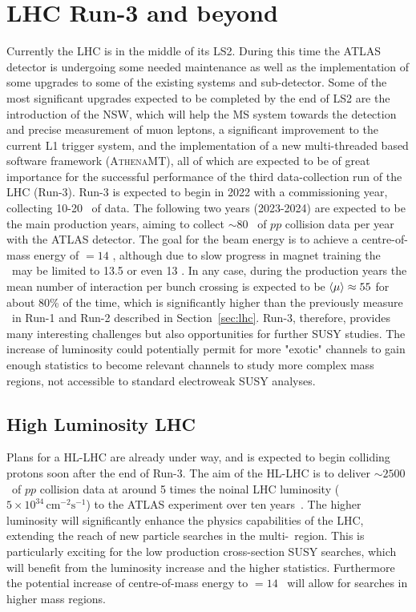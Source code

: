 	\section{\ac{LHC} Run-3 and beyond}
	\label{sec:lhc&beyond}	
	Currently the \ac{LHC} is in the middle of its \ac{LS2}. During this time the \ac{ATLAS} detector is undergoing some needed maintenance as well as the implementation of some upgrades to some of the existing systems and sub-detector. 
	Some of the most significant upgrades expected to be completed by the end of \ac{LS2} are the introduction of the \ac{NSW}, which will help the \ac{MS} system towards the detection and precise measurement of muon leptons, a significant improvement to the current \ac{L1} trigger system, and the implementation of a new multi-threaded based software framework (\textsc{AthenaMT}), all of which are expected to be of great importance for the successful performance of the third data-collection run of the \ac{LHC} (Run-3).
	Run-3 is expected to begin in 2022 with a commissioning year, collecting 10-20 \infb\ of data. 
	The following two years (2023-2024) are expected to be the main production years, aiming to collect $\sim80$ \infb\ of $pp$ collision data per year with the \ac{ATLAS} detector. 
	The goal for the beam energy is to achieve a centre-of-mass energy of \com$=14$ \tev , although due to slow progress in magnet training the \com\ may be limited to 13.5 or even 13 \tev .
	In any case, during the production years the mean number of interaction per bunch crossing is expected to be $\langle\mu\rangle\approx55$ for about 80\% of the time, which is significantly higher than the previously measure \mubar\ in Run-1 and Run-2 described in Section~\ref{sec:lhc}.
	Run-3, therefore, provides many interesting challenges but also opportunities for further \ac{SUSY} studies. The increase of luminosity could potentially permit for more "exotic" channels to gain enough statistics to become relevant channels to study more complex mass regions, not accessible to standard electroweak \ac{SUSY} analyses.
	\subsection*{High Luminosity LHC}
	Plans for a \ac{HL-LHC} are already under way, and is expected to begin colliding protons soon after the end of Run-3. The aim of the \ac{HL-LHC} is to deliver $\sim2500$ \infb\ of $pp$ collision data at around 5 times the noinal \ac{LHC} luminosity ($5\times10^{34}\,\mathrm{cm}^{-2}\mathrm{s}^{-1}$) to the \ac{ATLAS} experiment over ten years~\cite{HLLHC}.
	The higher luminosity will significantly enhance the physics capabilities of the \ac{LHC}, extending the reach of new particle searches in the multi-\tev\ region.
	 This is particularly exciting for the low production cross-section \ac{SUSY} searches, which will benefit from the luminosity increase and the higher statistics.
	 Furthermore the potential increase of centre-of-mass energy to \com$=14$ \tev\ will allow for searches in higher mass regions. 
	
